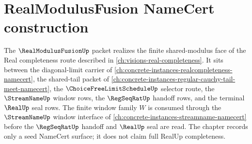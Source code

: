 \chapter{RealModulusFusion NameCert construction}
\label{ch:concrete-instances-realmodulusfusion-namecert}

The $\RealModulusFusionUp$ packet realizes the finite shared-modulus face of the Real completeness route described in \autoref{ch:visions-real-completeness}. It sits between the diagonal-limit carrier of \autoref{ch:concrete-instances-realcompleteness-namecert}, the shared-tail packet of \autoref{ch:concrete-instances-regular-cauchy-tail-meet-namecert}, the $\ChoiceFreeLimitScheduleUp$ selector route, the $\StreamNameUp$ window rows, the $\RegSeqRatUp$ handoff rows, and the terminal $\RealUp$ seal rows. The finite window family $W$ is consumed through the $\StreamNameUp$ window interface of \autoref{ch:concrete-instances-streamname-namecert} before the $\RegSeqRatUp$ handoff and $\RealUp$ seal are read. The chapter records only a seed NameCert surface; it does not claim full RealUp completeness.

